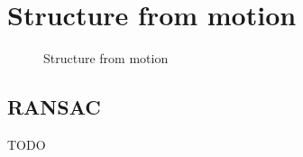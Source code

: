 \section{Structure from motion} \label{sec:sfm}

\begin{figure}[ht]
    \centering
    \caption{Structure from motion}
    \label{fig:structure-from-motion}
\end{figure}

\subsection{RANSAC}

TODO
